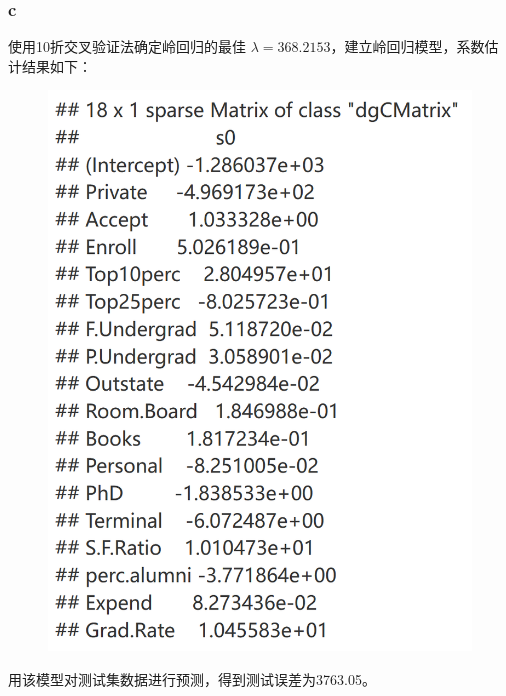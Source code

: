 \documentclass[12pt,a4paper]{article}
\begin{document}
    \subsubsection*{c}
    使用10折交叉验证法确定岭回归的最佳 $\lambda=368.2153$，建立岭回归模型，系数估计结果如下：
    \begin{figure}[H]
        \centering
        \includegraphics[scale=0.25]{Ridge.png}
    \end{figure}
    用该模型对测试集数据进行预测，得到测试误差为3763.05。
\end{document}
